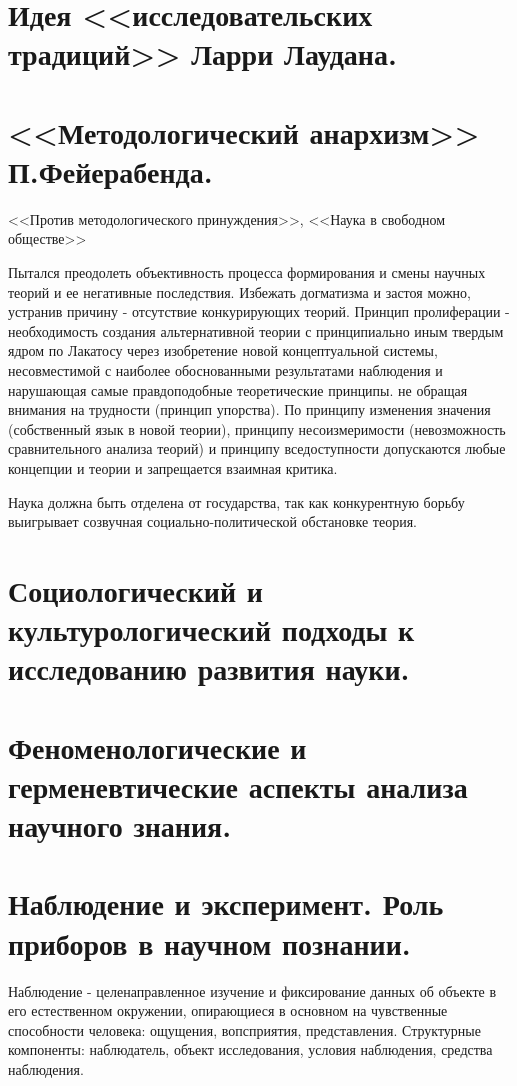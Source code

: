 \documentclass[12pt, specialist, subf, substylefile = spbu.rtx]{disser}
\begin{document}
\section{Идея <<исследовательских традиций>> Ларри Лаудана.}

\section{<<Методологический анархизм>> П.Фейерабенда.}
<<Против методологического принуждения>>,  <<Наука в свободном обществе>>

Пытался преодолеть объективность процесса формирования и смены научных теорий и ее негативные последствия. Избежать догматизма и застоя можно, устранив причину - отсутствие конкурирующих теорий. Принцип пролиферации - необходимость создания альтернативной теории с принципиально иным твердым ядром по Лакатосу через изобретение новой концептуальной системы, несовместимой с наиболее обоснованными результатами наблюдения и нарушающая самые правдоподобные теоретические принципы. не обращая внимания на трудности (принцип упорства). По принципу изменения значения (собственный язык в новой теории), принципу несоизмеримости (невозможность сравнительного анализа теорий) и принципу вседоступности допускаются любые концепции и теории и запрещается взаимная критика.

Наука должна быть отделена от государства, так как конкурентную борьбу выигрывает созвучная социально-политической обстановке теория.

\section{Социологический и культурологический подходы к исследованию развития науки.}

\section{Феноменологические и герменевтические аспекты анализа научного знания.}

\section{Наблюдение и эксперимент. Роль приборов в научном познании.}
Наблюдение - целенаправленное изучение и фиксирование данных об объекте в его естественном окружении, опирающиеся в основном на чувственные способности человека: ощущения, вопсприятия, представления. Структурные компоненты: наблюдатель, объект исследования, условия наблюдения, средства наблюдения.
\end{document}
